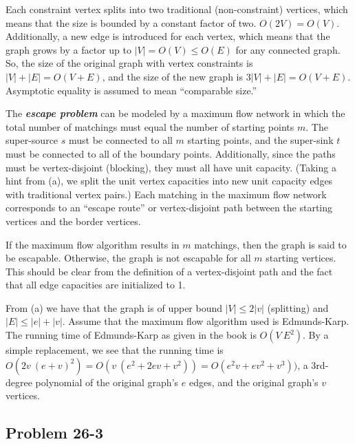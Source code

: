 \documentclass[10pt,fullpage]{article}
\begin{document}
Each constraint vertex splits into two traditional (non-constraint)
vertices, which means that the size is bounded by a constant factor
of two. $O(2V) = O(V)$. Additionally, a new edge is introduced for
each vertex, which means that the graph grows by a factor up to $|V|
= O(V) \leq O(E)$ for any connected graph. So, the size of the
original graph with vertex constraints is $|V| + |E| = O(V+E)$, and
the size of the new graph is $3|V| + |E| = O(V+E)$. Asymptotic
equality is assumed to mean ``comparable size.''


The \textbf{\em escape problem} can be modeled by a maximum flow
network in which the total number of matchings must equal the number
of starting points $m$. The super-source $s$ must be connected to
all $m$ starting points, and the super-sink $t$ must be connected to
all of the boundary points. Additionally, since the paths must be
vertex-disjoint (blocking), they must all have unit capacity.
(Taking a hint from (a), we split the unit vertex capacities into
new unit capacity edges with traditional vertex pairs.) Each
matching in the maximum flow network corresponds to an ``escape
route'' or vertex-disjoint path between the starting vertices and
the border vertices.

If the maximum flow algorithm results in $m$ matchings, then the
graph is said to be escapable. Otherwise, the graph is not escapable
for all $m$ starting vertices. This should be clear from the
definition of a vertex-disjoint path and the fact that all edge
capacities are initialized to {\large 1}.

From (a) we have that the graph is of upper bound $|V| \leq 2|v|$
(splitting) and $|E| \leq |e| + |v|$. Assume that the maximum flow
algorithm used is Edmunds-Karp. The running time of Edmunds-Karp as
given in the book is $O(V\ E^2)$. By a simple replacement, we see
that the running time is $O(2v\ (e+v)^2) = O(v\ (e^2+2ev+v^2)) =
O(e^2v+ev^2+v^3))$, a 3rd-degree polynomial of the original graph's
$e$ edges, and the original graph's $v$ vertices.

\newpage

\subsection*{Problem 26-3}
\end{document}
